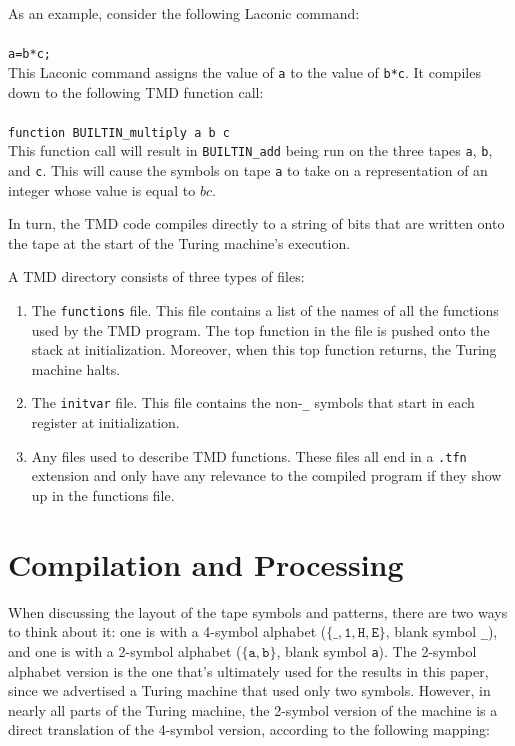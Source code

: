 \documentclass[11pt]{article}
\begin{document}
As an example, consider the following Laconic command: \\ \\
\texttt{a=b*c;} \\

This Laconic command assigns the value of \texttt{a} to the value of \texttt{b*c}. It compiles down to the following TMD function call: \\ \\
\texttt{function BUILTIN\_multiply a b c} \\

This function call will result in \texttt{BUILTIN\_add} being run on the three tapes \texttt{a}, \texttt{b}, and \texttt{c}. This will cause the symbols on tape \texttt{a} to take on a representation of an integer whose value is equal to $bc$.

In turn, the TMD code compiles directly to a string of bits that are written onto the tape at the start of the Turing machine's execution.

A TMD directory consists of three types of files:

\begin{enumerate}
\item The \texttt{functions} file. This file contains a list of the names of all the functions used by the TMD program. The top function in the file is pushed onto the stack at initialization. Moreover, when this top function returns, the Turing machine halts.
\item The \texttt{initvar} file. This file contains the non-\texttt{\_} symbols that start in each register at initialization. 
\item Any files used to describe TMD functions. These files all end in a \texttt{.tfn} extension and only have any relevance to the compiled program if they show up in the functions file.
\end{enumerate}

\section{Compilation and Processing}

When discussing the layout of the tape symbols and patterns, there are two ways to think about it: one is with a 4-symbol alphabet ($\{\texttt{\_}, \texttt{1}, \texttt{H}, \texttt{E}\}$, blank symbol \texttt{\_}), and one is with a 2-symbol alphabet ($\{\texttt{a}, \texttt{b}\}$, blank symbol \texttt{a}). The 2-symbol alphabet version is the one that's ultimately used for the results in this paper, since we advertised a Turing machine that used only two symbols. However, in nearly all parts of the Turing machine, the 2-symbol version of the machine is a direct translation of the 4-symbol version, according to the following mapping:
\end{document}
